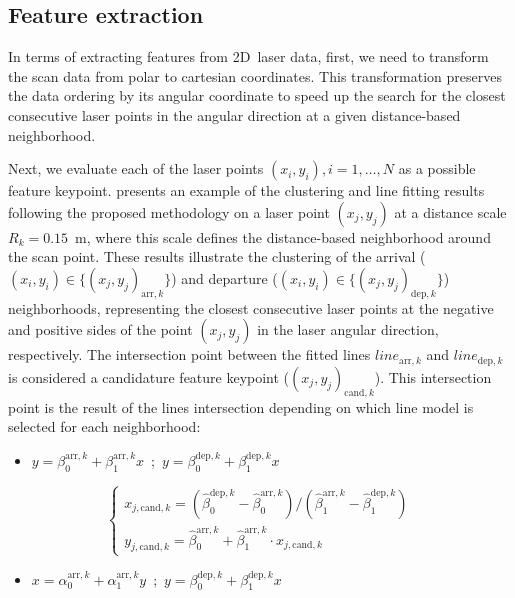 \subsection{Feature extraction}\label{sec:features:extraction}

In terms of extracting features from 2D~laser data, first, we need
to transform the scan data from polar to cartesian coordinates.
This transformation preserves the data ordering by its angular coordinate
to speed up the search for the closest consecutive laser points
in the angular direction at a given distance-based neighborhood.

Next, we evaluate each of the laser points $\left(x_i,y_i\right),i=1,\dots,N$
as a possible feature keypoint.
 presents an example of the clustering
and line fitting results following the proposed methodology on a laser point
$(x_j,y_j)$ at a distance scale $R_k=0.15$~m, where this scale defines
the distance-based neighborhood around the scan point.
These results illustrate the clustering of the arrival
($\left(x_i,y_i\right) \in \{(x_j,y_j)_{\text{arr},k}\}$) and departure
($\left(x_i,y_i\right) \in \{(x_j,y_j)_{\text{dep},k}\}$) neighborhoods,
representing the closest consecutive laser points at the negative and positive
sides of the point $(x_j,y_j)$ in the laser angular direction, respectively.
The intersection point between the fitted lines $line_{\text{arr},k}$ and
$line_{\text{dep},k}$ is considered a candidature feature keypoint
($(x_j,y_j)_{\text{cand},k}$). This intersection point is the result of
the lines intersection depending on which line model
is selected for each neighborhood:
\begin{itemize}
\item $y=\beta_0^{\text{arr},k} + \beta_1^{\text{arr},k} x \enspace$;$\enspace y = \beta_0^{\text{dep},k} + \beta_1^{\text{dep},k} x$
\end{itemize}
\begin{equation}
\left\{
\begin{smallmatrix}
x_{j,\text{cand},k} = \left(\hat{\beta}_{0}^{\text{dep},k}-\hat{\beta}_{0}^{\text{arr},k}\right) / \left(\hat{\beta}_{1}^{\text{arr},k}-\hat{\beta}_{1}^{\text{dep},k}\right)\\
y_{j,\text{cand},k} = \hat{\beta}_{0}^{\text{arr},k} + \hat{\beta}_{1}^{\text{arr},k} \cdot x_{j,\text{cand},k}
\end{smallmatrix}
\right.
\end{equation}
\begin{itemize}
\item $x=\alpha_0^{\text{arr},k} + \alpha_1^{\text{arr},k} y \enspace$;$\enspace y = \beta_0^{\text{dep},k} + \beta_1^{\text{dep},k} x$
\end{itemize}
